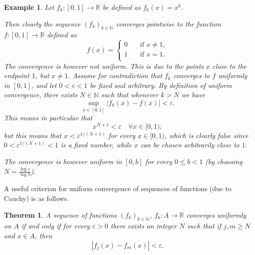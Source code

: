 \documentclass[a4paper,reqno]{amsart}
\numberwithin{equation}{section}
\newtheorem{theorem}[definition]{Theorem}
\newtheorem{example}[definition]{Example}
\def\N{\mathbb{N}}
\def\R{\mathbb{R}}
\begin{document}
\begin{example}
Let $f_k: [0,1] \to \R$ be defined as $f_k(x)=x^k$. 

Then clearly the sequence $(f_k)_{k\in \N}$ converges pointwise to the function $f:[0,1] \to \R$ defined as 
$$
f(x) = \begin{cases}
0 \quad &\textrm{if } x\neq 1,\\
1 \quad &\textrm{if } x = 1.\\
\end{cases}
$$
The convergence is however not uniform. This is due to the points $x$ close to the endpoint $1$, but $x\neq 1$. Assume for contradiction that $f_k$ converges to $f$ uniformly in $[0,1]$, and let $0<\varepsilon<1$ be 
fixed and arbitrary. By definition of uniform convergence, there exists $N\in \N$ such that whenever $k>N$ we have 
$$
\sup_{x\in [0,1]} |f_k(x) - f(x)| <\varepsilon.
$$ 
This means in particular that  
$$
x^{N+1} < \varepsilon \quad \forall x\in [0,1);
$$
but this means that $x<\varepsilon^{1/(N+1)}$ for every $x\in [0,1)$, which is clearly false since $0<\varepsilon^{1/(N+1)}<1$ is a fixed number, while $x$ can be chosen arbitrarily close to $1$.

\medskip

The convergence is however uniform in $[0,b]$ for every $0\leq b <1$ (by choosing $N = \frac{\log\varepsilon}{\log b}$).
\end{example}

\medskip

A useful criterion for uniform convergence of sequences of functions (due to Cauchy) is as follows. 

\begin{theorem}\label{Cauchy:c}
A sequence of functions $(f_k)_{k\in \mathbb{N}}$, $f_k:A\to \R$ converges uniformly on $A$ if and only if for every $\varepsilon>0$ there exists an integer $N$ such that if $j,m\geq N$ and $x\in A$, then
$$
|f_j(x) - f_m(x)| < \varepsilon.
$$
\end{theorem}
\end{document}
